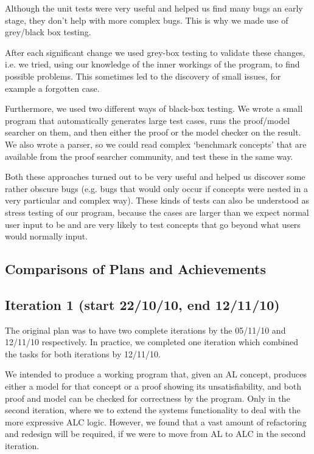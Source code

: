 Although the unit tests were very useful and helped us find many bugs an early stage, they don't help with more complex bugs. This is why we made use of grey/black box testing.

After each significant change we used grey-box testing to validate these changes, i.e. we tried, using our knowledge of the inner workings of the program, to find possible problems. This sometimes led to the discovery of small issues, for example a forgotten case.

Furthermore, we used two different ways of black-box testing. We wrote a small program that automatically generates large test cases, runs the proof/model searcher on them, and then either the proof or the model checker on the result. We also wrote a parser, so we could read complex `benchmark concepts' that are available from the proof searcher community, and test these in the same way.

Both these approaches turned out to be very useful and helped us discover some rather obscure bugs (e.g. bugs that would only occur if concepts were nested in a very particular and complex way). These kinds of tests can also be understood as stress testing of our program, because the cases are larger than we expect normal user input to be and are very likely to test concepts that go beyond what users would normally input.

\subsection{Comparisons of Plans and Achievements}

\subsection*{Iteration 1 (start 22/10/10, end 12/11/10)}

The original plan was to have two complete iterations by the 05/11/10 and 12/11/10 respectively. In practice, we completed one iteration which combined the tasks for both iterations by 12/11/10.

We intended to produce a working program that, given an AL concept, produces either a model for that concept or a proof showing its unsatisfiability, and both proof and model can be checked for correctness by the program. Only in the second iteration, where we to extend the systems functionality to deal with the more expressive ALC logic. However, we found that a vast amount of refactoring and redesign will be required, if we were to move from AL to ALC in the second iteration.

